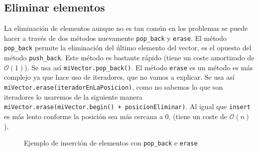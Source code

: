 \documentclass{article}
\begin{document}
    \subsection{Eliminar elementos}

    La eliminación de elementos aunque no es tan común en los problemas se puede hacer a través de dos métodos nuevamente
    \texttt{pop\_back} y \texttt{erase}. El método \texttt{pop\_back} permite la eliminación del último elemento del
    vector, es el opuesto del método \texttt{push\_back}. Este método es bastante rápido (tiene un coste amortizado de 
    $\mathcal{O}(1)$). Se usa así \texttt{miVector.pop\_back()}. El método \texttt{erase} es un método es más complejo 
    ya que hace uso de iteradores, que no vamos a explicar. Se usa así \texttt{miVector.erase(iteradorEnLaPosicion)},
    como no sabemos lo que son iteradores lo usaremos de la siguiente manera \texttt{miVector.erase(miVector.begin() + posicionEliminar)}.
    Al igual que \texttt{insert} es más lento conforme la posición sea más cercana a 0, (tiene un coste de 
    $\mathcal{O}(n)$).

    \begin{figure}[h]
        \centering
        \caption{Ejemplo de inserción de elementos con \texttt{pop\_back} e \texttt{erase}}
    \end{figure}
\end{document}
